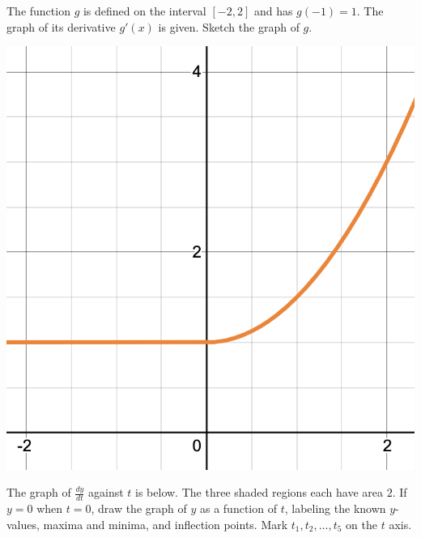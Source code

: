 \documentclass[11pt]{exam}
\begin{document}
\begin{questions}
  \begin{minipage}{0.5\linewidth}
    The function $g$ is defined on the interval $[-2,2]$ and has
    $g(-1)=1$. The graph of its derivative $g'(x)$ is given. Sketch
    the graph of $g$.
  \end{minipage}
  \begin{minipage}{0.5\linewidth}
  \end{minipage}
  \begin{solution}
   \includegraphics[scale=0.5]{4}
  \end{solution}
  \pagebreak
\question The graph of \(\frac{dy}{dt}\) against \(t\) is below. The
  three shaded regions each have area \(2\). If \(y=0\) when \(t=0\), 
  draw the graph of \(y\) as a function of \(t\), labeling the known
  \(y\)-values, maxima and minima, and inflection points. Mark \(t_1,
  t_2, \ldots, t_5\) on the \(t\) axis.


\end{questions}
\end{document}
